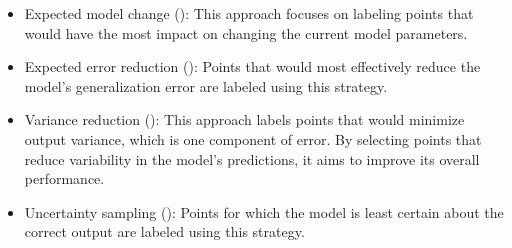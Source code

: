\documentclass[
  letterpaper,
  DIV=11,
  numbers=noendperiod,
  oneside]{scrreprt}
\theoremstyle{remark}
\begin{document}
\begin{itemize}
\item
  Expected model change (): This approach focuses on labeling points that would
  have the most impact on changing the current model parameters.
\item
  Expected error reduction (): Points that would most effectively reduce the model's
  generalization error are labeled using this strategy.
\item
  Variance reduction (): This approach labels points that would minimize output
  variance, which is one component of error. By selecting points that
  reduce variability in the model's predictions, it aims to improve its
  overall performance.
\item
  Uncertainty sampling ():
  Points for which the model is least certain about the correct output
  are labeled using this strategy.


\end{itemize}
\end{document}
